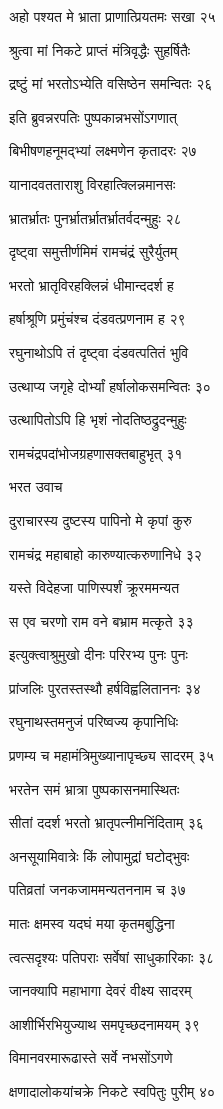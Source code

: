 अहो पश्यत मे भ्राता प्राणात्प्रियतमः सखा २५

श्रुत्वा मां निकटे प्राप्तं मंत्रिवृद्धैः सुहर्षितैः

द्रष्टुं मां भरतोऽभ्येति वसिष्ठेन समन्वितः २६

इति ब्रुवन्नरपतिः पुष्पकान्नभसोंऽगणात्

बिभीषणहनूमद्भ्यां लक्ष्मणेन कृतादरः २७

यानादवतताराशु विरहात्क्लिन्नमानसः

भ्रातर्भ्रातः पुनर्भ्रातर्भ्रातर्भ्रातर्वदन्मुहुः २८

दृष्ट्वा समुत्तीर्णमिमं रामचंद्रं सुरैर्युतम्

भरतो भ्रातृविरहक्लिन्नं धीमान्ददर्श ह

हर्षाश्रूणि प्रमुंचंश्च दंडवत्प्रणनाम ह २९

रघुनाथोऽपि तं दृष्ट्वा दंडवत्पतितं भुवि

उत्थाप्य जगृहे दोर्भ्यां हर्षालोकसमन्वितः ३०

उत्थापितोऽपि हि भृशं नोदतिष्ठद्रुदन्मुहुः

रामचंद्रपदांभोजग्रहणासक्तबाहुभृत् ३१

भरत उवाच

दुराचारस्य दुष्टस्य पापिनो मे कृपां कुरु

रामचंद्र महाबाहो कारुण्यात्करुणानिधे ३२

यस्ते विदेहजा पाणिस्पर्शं क्रूरममन्यत

स एव चरणो राम वने बभ्राम मत्कृते ३३

इत्युक्त्वाश्रुमुखो दीनः परिरभ्य पुनः पुनः

प्रांजलिः पुरतस्तस्थौ हर्षविह्वलिताननः ३४

रघुनाथस्तमनुजं परिष्वज्य कृपानिधिः

प्रणम्य च महामंत्रिमुख्यानापृच्छ्य सादरम् ३५

भरतेन समं भ्रात्रा पुष्पकासनमास्थितः

सीतां ददर्श भरतो भ्रातृपत्नीमनिंदिताम् ३६

अनसूयामिवात्रेः किं लोपामुद्रां घटोद्भुवः

पतिव्रतां जनकजाममन्यतननाम च ३७

मातः क्षमस्व यदघं मया कृतमबुद्धिना

त्वत्सदृश्यः पतिपराः सर्वेषां साधुकारिकाः ३८

जानक्यापि महाभागा देवरं वीक्ष्य सादरम्

आशीर्भिरभियुज्याथ समपृच्छदनामयम् ३९

विमानवरमारूढास्ते सर्वे नभसोंऽगणे

क्षणादालोकयांचक्रे निकटे स्वपितुः पुरीम् ४०

